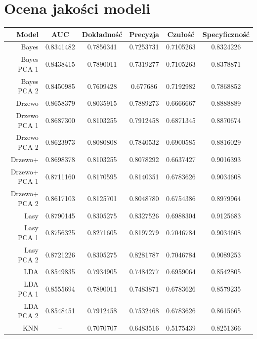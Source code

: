 \documentclass{article}
\begin{document}
\section{Ocena jakości modeli}
\begin{center}
    \begin{tabular}{| r | c | c | c | c | c |}
    \hline
        Model & AUC & Dokładność &  Precyzja &  Czułość & Specyficzność \\ \hline
        Bayes & 0.8341482 & 0.7856341 & 0.7253731 & 0.7105263 & 0.8324226  \\ \hline
        Bayes PCA 1 & 0.8438415 & 0.7890011 & 0.7319277 & 0.7105263 & 0.8378871  \\ \hline
        Bayes PCA 2 & 0.8450985 & 0.7609428 & 0.677686 & 0.7192982 & 0.7868852  \\ \hline
        Drzewo & 0.8658379 & 0.8035915 & 0.7889273 & 0.6666667 & 0.8888889 \\ \hline
        Drzewo PCA 1 & 0.8687300 & 0.8103255 & 0.7912458 & 0.6871345 & 0.8870674  \\ \hline
        Drzewo PCA 2 & 0.8623973 & 0.8080808 & 0.7840532 & 0.6900585 & 0.8816029  \\ \hline
        Drzewo+ & 0.8698378 & 0.8103255 & 0.8078292 & 0.6637427 & 0.9016393 \\ \hline
        Drzewo+ PCA 1 & 0.8711160 & 0.8170595 & 0.8140351 & 0.6783626 & 0.9034608  \\ \hline
        Drzewo+ PCA 2 & 0.8617103 & 0.8125701 & 0.8048780 & 0.6754386 & 0.8979964  \\ \hline
        Lasy & 0.8790145 & 0.8305275 & 0.8327526 & 0.6988304 & 0.9125683 \\ \hline
        Lasy PCA 1 & 0.8756325 & 0.8271605 & 0.8197279 & 0.7046784 & 0.9034608 \\ \hline
        Lasy PCA 2 & 0.8721226 & 0.8305275 & 0.8281787 & 0.7046784 & 0.9089253  \\ \hline
        LDA & 0.8549835 & 0.7934905 & 0.7484277 & 0.6959064 & 0.8542805 \\ \hline
        LDA PCA 1 & 0.8555694 & 0.7890011 & 0.7483871 & 0.6783626 & 0.8579235  \\ \hline
        LDA PCA 2 & 0.8548451 & 0.7912458 & 0.7532468 & 0.6783626 & 0.8615665  \\ \hline
        KNN & -- & 0.7070707 & 0.6483516 & 0.5175439 & 0.8251366  \\
    \hline
    \end{tabular}
\end{center}
\end{document}

